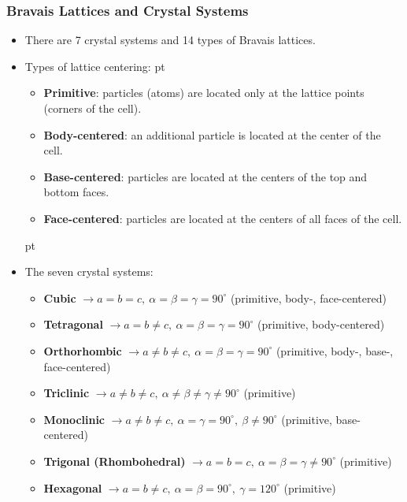 \documentclass[t,aspectratio=169]{beamer}
\begin{document}
\begin{frame}
\frametitle{Bravais Lattices and Crystal Systems}
\begin{itemize}
\setlength{\parskip}{0pt}
\setlength{\itemsep}{0pt}
\item There are 7 crystal systems and 14 types of Bravais lattices.
\item Types of lattice centering:
 pt
\begin{itemize}
\setlength{\parskip}{0pt}
\setlength{\itemsep}{0pt}
\item \textbf{Primitive}: particles (atoms) are located only at the lattice points (corners of the cell).
\item \textbf{Body-centered}: an additional particle is located at the center of the cell.
\item \textbf{Base-centered}: particles are located at the centers of the top and bottom faces.
\item \textbf{Face-centered}: particles are located at the centers of all faces of the cell.
\end{itemize}
 pt
\item The seven crystal systems:
\begin{itemize}
\setlength{\parskip}{0pt}
\setlength{\itemsep}{0pt}
\item \textbf{Cubic} $\rightarrow a=b=c, \ \alpha=\beta=\gamma=90^{\circ}$ \hfill (primitive, body-, face-centered)
\item \textbf{Tetragonal} $\rightarrow a=b\ne c, \ \alpha=\beta=\gamma=90^{\circ}$ \hfill (primitive, body-centered)
\item \textbf{Orthorhombic} $\rightarrow a\ne b\ne c, \ \alpha=\beta=\gamma=90^{\circ}$ \hfill (primitive, body-, base-, face-centered)
\item \textbf{Triclinic} $\rightarrow a\ne b\ne c, \ \alpha\ne\beta\ne\gamma\ne90^{\circ}$ \hfill (primitive)
\item \textbf{Monoclinic} $\rightarrow a\ne b\ne c, \ \alpha=\gamma=90^{\circ}, \ \beta\ne90^{\circ}$ \hfill (primitive, base-centered)
 \pagebreak
\item \textbf{Trigonal (Rhombohedral)} $\rightarrow a=b=c, \ \alpha=\beta=\gamma\ne90^{\circ}$ \hfill (primitive)
\item \textbf{Hexagonal} $\rightarrow a=b\ne c, \ \alpha=\beta=90^{\circ}, \ \gamma=120^{\circ}$ \hfill (primitive)
\end{itemize}
\end{itemize}


\end{frame}
\end{document}
